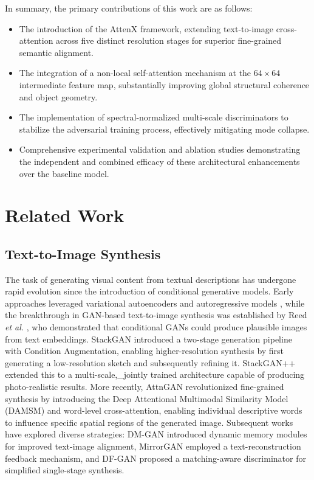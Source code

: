 \documentclass[conference]{IEEEtran}
\begin{document}
In summary, the primary contributions of this work are as follows:
\begin{itemize}
    \item The introduction of the AttenX framework, extending text-to-image cross-attention across five distinct resolution stages for superior fine-grained semantic alignment.
    \item The integration of a non-local self-attention mechanism at the $64 \times 64$ intermediate feature map, substantially improving global structural coherence and object geometry.
    \item The implementation of spectral-normalized multi-scale discriminators to stabilize the adversarial training process, effectively mitigating mode collapse.
    \item Comprehensive experimental validation and ablation studies demonstrating the independent and combined efficacy of these architectural enhancements over the baseline model.
\end{itemize}

\section{Related Work}

\subsection{Text-to-Image Synthesis}
The task of generating visual content from textual descriptions has undergone rapid evolution since the introduction of conditional generative models. Early approaches leveraged variational autoencoders and autoregressive models \cite{van2016conditional}, while the breakthrough in GAN-based text-to-image synthesis was established by Reed \textit{et al.} \cite{reed2016generative}, who demonstrated that conditional GANs could produce plausible images from text embeddings. StackGAN \cite{zhang2017stackgan} introduced a two-stage generation pipeline with Condition Augmentation, enabling higher-resolution synthesis by first generating a low-resolution sketch and subsequently refining it. StackGAN++ \cite{zhang2018stackgan} extended this to a multi-scale,\_jointly trained architecture capable of producing photo-realistic results. More recently, AttnGAN \cite{xu2018attngan} revolutionized fine-grained synthesis by introducing the Deep Attentional Multimodal Similarity Model (DAMSM) and word-level cross-attention, enabling individual descriptive words to influence specific spatial regions of the generated image. Subsequent works have explored diverse strategies: DM-GAN \cite{zhu2019dmgan} introduced dynamic memory modules for improved text-image alignment, MirrorGAN \cite{qiao2020mirrorgan} employed a text-reconstruction feedback mechanism, and DF-GAN \cite{tao2022dfgan} proposed a matching-aware discriminator for simplified single-stage synthesis.
\end{document}
